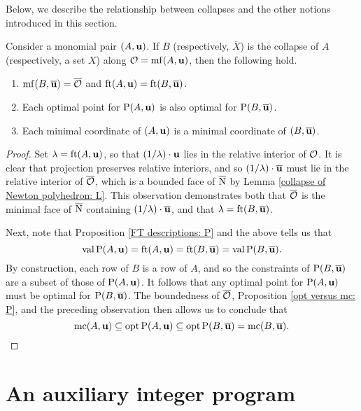 \documentclass[11pt]{amsart}
\renewcommand{\!}[1]{{\color{red}\text{$\star$\,}#1\,$\star$}}
\newcommand{\ol}[1]{\overline{#1}}
\begin{document}
Below, we describe the relationship between collapses and the other notions introduced in this section.

\begin{corollary}
\label{collapse of mf and mc: C}
Consider a monomial pair $(A, \mathbf{u})$.  If $B$ (respectively, $\ol{X}$) is the collapse of $A$ (respectively, a set $X$) along $\mathcal{O} = \operatorname{mf}(A, \mathbf{u})$, then the following hold.

\begin{enumerate}
\item $\mf(B, \ol{\vv{u}}) = \ol{\O}$ and $\ft{A}{\vv{u}} = \ft{B}{\ol{\vv{u}}}$.
\item Each optimal point for $\mathrm{P}(A, \mathbf{u})$ is also optimal for $\LP(B, \ol{\vv{u}})$.  
\item Each minimal coordinate of $(A, \mathbf{u})$ is a minimal coordinate of $(B, \ol{\vv{u}})$.
\end{enumerate}
\end{corollary}

\begin{proof}
Set $\lambda = \operatorname{ft}(A, \mathbf{u})$, so that $(1 / \lambda) \cdot \mathbf{u}$ lies in the relative interior of $\mathcal{O}$.  It is clear that projection preserves relative interiors, and so $(1/\lambda) \cdot \ol{\vv{u}}$ must lie in the relative interior of $\ol{\O}$, which is a bounded face of $\ol{\N}$ by Lemma \ref{collapse of Newton polyhedron: L}.  This observation demonstrates both that $\ol{\O}$ is the minimal face of $\ol{\N}$ containing $(1/\lambda) \cdot \ol{\vv{u}}$, and that $\lambda = \ft{B}{\ol{\vv{u}}}$.  

Next, note that Proposition \ref{FT descriptions: P} and the above tells us that \[ \val \LP(A, \vv{u}) = \ft{A}{\vv{u}} = \ft{B}{\ol{\vv{u}}} = \val \LP(B, \ol{\vv{u}}). \] 
%
By construction, each row of $B$ is a row of $A$, and so the constraints of $\LP(B, \ol{\vv{u}})$ are a subset of those of $\mathrm{P}(A, \mathbf{u})$.  It follows that any optimal point for $\mathrm{P}(A, \mathbf{u})$ must be optimal for $\LP(B, \ol{\vv{u}})$.  The boundedness of $\ol{\O}$, Proposition \ref{opt versus mc: P}, and the preceding observation then allows us to conclude that
\[ \mc(A, \vv{u}) \subseteq \opt \LP(A, \vv{u}) \subseteq \opt \LP(B, \ol{\vv{u}}) = \mc(B, \ol{\vv{u}}).\] 
\end{proof}




\newpage
\section{An auxiliary integer program}
\end{document}
